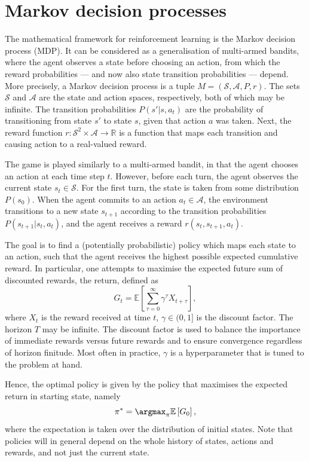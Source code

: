\section{Markov decision processes}
\label{sec:mdp}
The mathematical framework for reinforcement learning is the Markov decision process (MDP).
It can be considered as a generalisation of multi-armed bandits, where the agent observes a state before choosing an action, from which the reward probabilities — and now also state transition probabilities — depend.
More precisely, a Markov decision process is a tuple $M = (\mathcal{S}, \mathcal{A}, P, r)$.
The sets $\mathcal{S}$ and $\mathcal{A}$ are the state and action spaces, respectively, both of which may be infinite.
The transition probabilities $P(s' | s, a_t)$ are the probability of transitioning from state $s'$ to state $s$, given that action $a$ was taken.
Next, the reward function $r : \mathcal{S}^2 \times \mathcal{A} \to \mathbb{R}$ is a function that maps each transition and causing action to a real-valued reward.

The game is played similarly to a multi-armed bandit, in that the agent chooses an action at each time step $t$.
However, before each turn, the agent observes the current state $s_t \in \mathcal{S}$.
For the first turn, the state is taken from some distribution $P(s_0)$.
When the agent commits to an action $a_t \in \mathcal{A}$, the environment transitions to a new state $s_{t+1}$ according to the transition probabilities $P(s_{t+1} | s_t, a_t)$, and the agent receives a reward $r(s_t, s_{t+1}, a_t)$.

The goal is to find a (potentially probabilistic) policy which maps each state to an action, such that the agent receives the highest possible expected cumulative reward.
In particular, one attempts to maximise the expected future sum of discounted rewards, the return, defined as
\begin{equation}
    G_t = \mathbb{E} \left[ \sum_{\tau=0}^{\infty} \gamma^\tau X_{t+\tau} \right],
\end{equation}
where $X_t$ is the reward received at time $t$, $\gamma \in (0,1]$ is the discount factor.
The horizon $T$ may be infinite.
The discount factor is used to balance the importance of immediate rewards versus future rewards and to ensure convergence regardless of horizon finitude.
Most often in practice, $\gamma$ is a hyperparameter that is tuned to the problem at hand.

Hence, the optimal policy is given by the policy that maximises the expected return in starting state, namely
\begin{equation}
    \pi^* = \argmax_{\pi} \mathbb{E} \left[ G_0 \right],
\end{equation}
where the expectation is taken over the distribution of initial states.
Note that policies will in general depend on the whole history of states, actions and rewards, and not just the current state.

